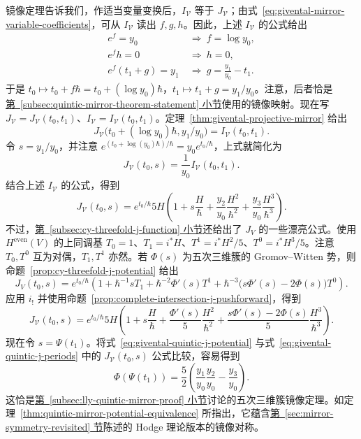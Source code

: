 \begin{example}
镜像定理告诉我们，作适当变量变换后，$I_{\mathcal V}$ 等于 $J_{\mathcal V}$；由式~\eqref{eq:givental-mirror-variable-coefficients}，可从 $I_{\mathcal V}$ 读出 $f,g,h$。因此，上述 $I_{\mathcal V}$ 的公式给出
\[
\begin{aligned}
e^f=y_0&\ \Longrightarrow\ f=\log y_0,\\
e^fh=0&\ \Longrightarrow\ h=0,\\
e^f(t_1+g)=y_1&\ \Longrightarrow\ g=\frac{y_1}{y_0}-t_1.
\end{aligned}
\]
于是 $t_0\mapsto t_0+f\hbar=t_0+(\log y_0)\hbar$，$t_1\mapsto t_1+g=y_1/y_0$。注意，后者恰是\hyperref[subsec:quintic-mirror-theorem-statement]{第~\ref*{subsec:quintic-mirror-theorem-statement} 小节}使用的镜像映射。现在写 $J_{\mathcal V}=J_{\mathcal V}(t_0,t_1)$、$I_{\mathcal V}=I_{\mathcal V}(t_0,t_1)$。定理~\ref{thm:givental-projective-mirror} 给出
\[
J_{\mathcal V}\bigl(t_0+(\log y_0)\hbar,y_1/y_0\bigr)=I_{\mathcal V}(t_0,t_1).
\]
令 $s=y_1/y_0$，并注意 $e^{(t_0+\log(y_0)\hbar)/\hbar}=y_0e^{t_0/\hbar}$，上式就简化为
\[
J_{\mathcal V}(t_0,s)=\frac1{y_0}I_{\mathcal V}(t_0,t_1).
\]
结合上述 $I_{\mathcal V}$ 的公式，得到
\begin{equation}\label{eq:givental-quintic-j-periods}
J_{\mathcal V}(t_0,s)=e^{t_0/\hbar}5H
\left(1+s\frac H\hbar+\frac{y_2}{y_0}\frac{H^2}{\hbar^2}
+\frac{y_3}{y_0}\frac{H^3}{\hbar^3}\right).
\end{equation}
不过，\hyperref[subsec:cy-threefold-j-function]{第~\ref*{subsec:cy-threefold-j-function} 小节}还给出了 $J_V$ 的一些漂亮公式。使用 $H^{\mathrm{even}}(V)$ 的上同调基
$T_0=1$、$T_1=i^*H$、$T^1=i^*H^2/5$、$T^0=i^*H^3/5$。注意 $T_0,T^0$ 互为对偶，$T_1,T^1$ 亦然。若 $\Phi(s)$ 为五次三维簇的 Gromov--Witten 势，则命题~\ref{prop:cy-threefold-j-potential} 给出
\[
J_V(t_0,s)=e^{t_0/\hbar}
\left(1+\hbar^{-1}sT_1+\hbar^{-2}\Phi'(s)T^1
+\hbar^{-3}\bigl(s\Phi'(s)-2\Phi(s)\bigr)T^0\right).
\]
应用 $i_!$ 并使用命题~\ref{prop:complete-intersection-j-pushforward}，得到
\begin{equation}\label{eq:givental-quintic-j-potential}
J_{\mathcal V}(t_0,s)=e^{t_0/\hbar}5H
\left(1+s\frac H\hbar+\frac{\Phi'(s)}5\frac{H^2}{\hbar^2}
+\frac{s\Phi'(s)-2\Phi(s)}5\frac{H^3}{\hbar^3}\right).
\end{equation}
现在令 $s=\Psi(t_1)$。将式~\eqref{eq:givental-quintic-j-potential} 与式~\eqref{eq:givental-quintic-j-periods} 中的 $J_{\mathcal V}(t_0,s)$ 公式比较，容易得到
\[
\Phi(\Psi(t_1))=\frac52\left(\frac{y_1}{y_0}\frac{y_2}{y_0}-\frac{y_3}{y_0}\right).
\]
这恰是\hyperref[subsec:lly-quintic-mirror-proof]{第~\ref*{subsec:lly-quintic-mirror-proof} 小节}讨论的五次三维簇镜像定理。如定理~\ref{thm:quintic-mirror-potential-equivalence} 所指出，它蕴含\hyperref[sec:mirror-symmetry-revisited]{第~\ref*{sec:mirror-symmetry-revisited} 节}陈述的 Hodge 理论版本的镜像对称。


\end{example}

